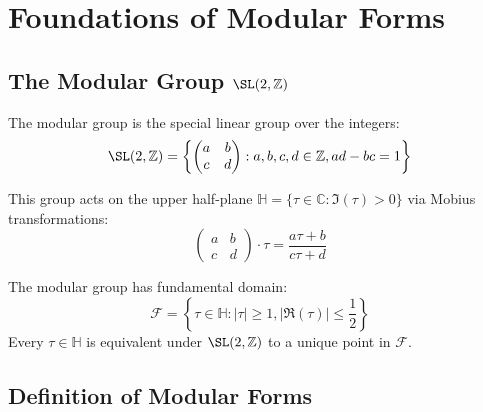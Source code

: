 \section{Foundations of Modular Forms}

\subsection{The Modular Group $\SL(2, \mathbb{Z})$}

\begin{definition}
The modular group is the special linear group over the integers:
\begin{equation}
    \SL(2, \mathbb{Z}) = \left\{ \begin{pmatrix} a & b \\ c & d \end{pmatrix} : a,b,c,d \in \mathbb{Z}, ad - bc = 1 \right\}
\end{equation}
\end{definition}

This group acts on the upper half-plane $\mathbb{H} = \{\tau \in \mathbb{C} : \Im(\tau) > 0\}$ via Mobius transformations:
\begin{equation}
    \begin{pmatrix} a & b \\ c & d \end{pmatrix} \cdot \tau = \frac{a\tau + b}{c\tau + d}
\end{equation}

\begin{theorem}
The modular group has fundamental domain:
\begin{equation}
    \mathcal{F} = \left\{ \tau \in \mathbb{H} : |\tau| \geq 1, \left|\Re(\tau)\right| \leq \frac{1}{2} \right\}
\end{equation}
Every $\tau \in \mathbb{H}$ is equivalent under $\SL(2,\mathbb{Z})$ to a unique point in $\mathcal{F}$.
\end{theorem}

\subsection{Definition of Modular Forms}

